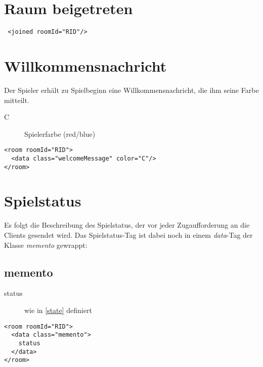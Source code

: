 \documentclass[12pt,a4paper, ngerman, oneside]{scrartcl}
\begin{document}
\section{Raum beigetreten}
 \begin{verbatim}
 <joined roomId="RID"/>
 \end{verbatim}

\section{Willkommensnachricht}
Der Spieler erhält zu Spielbeginn eine Willkommensnachricht, die ihm seine Farbe mitteilt.
\begin{description}
\item[C] Spielerfarbe (red/blue)
\end{description}
\begin{verbatim}
<room roomId="RID">
  <data class="welcomeMessage" color="C"/>
</room>
\end{verbatim}

\section{Spielstatus}
Es folgt die Beschreibung des Spielstatus, der vor jeder Zugaufforderung an die Clients gesendet wird. Das Spielstatus-Tag ist dabei noch in einem \textit{data}-Tag der Klasse \textit{memento} gewrappt:
\subsection{memento}
\begin{description}
\item[status] wie in \ref{state} definiert
\end{description}
\begin{verbatim}
<room roomId="RID"> 
  <data class="memento"> 
  	status
  </data> 
</room>
\end{verbatim}
\end{document}
